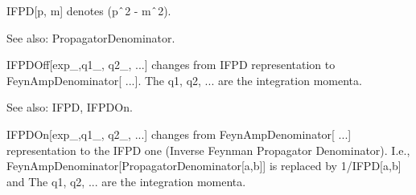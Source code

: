 





IFPD[p, m] denotes (p\(\RawWedge\)2 - m\(\RawWedge\)2).

See also:  PropagatorDenominator.



IFPDOff[exp\_{},q1\_{}, q2\_{}, ...] changes from IFPD representation to FeynAmpDenominator[ ...]. The q1, q2, ... are the integration
  momenta.

See also:  IFPD, IFPDOn.












IFPDOn[exp\_{},q1\_{}, q2\_{}, ...] changes from FeynAmpDenominator[ ...] representation to the IFPD one (Inverse Feynman Propagator
  Denominator). I.e., FeynAmpDenominator[PropagatorDenominator[a,b]] is replaced by 1/IFPD[a,b] and The q1, q2, ... are the integration
  momenta.

